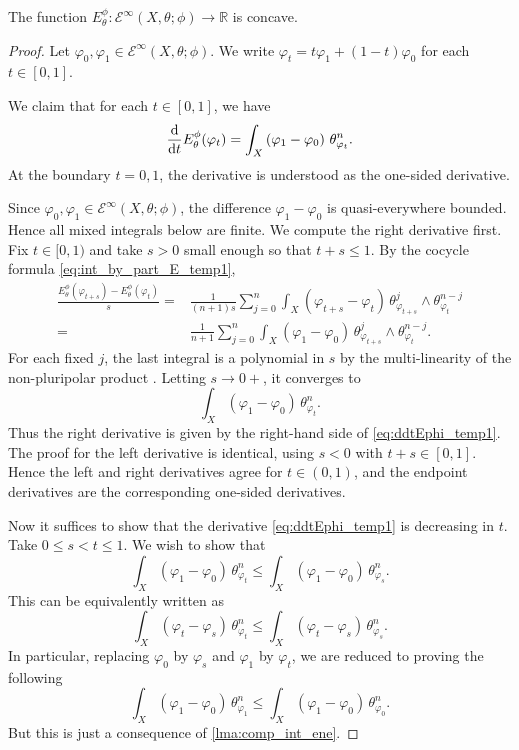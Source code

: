 \begin{lemma}\label{lma:Econcave1}
    The function $E^{\phi}_{\theta}\colon \mathcal{E}^{\infty}(X,\theta;\phi)\rightarrow \mathbb{R}$ is concave.
\end{lemma}
\begin{proof}
    Let $\varphi_0,\varphi_1\in \mathcal{E}^{\infty}(X,\theta;\phi)$. We write $\varphi_t=t\varphi_1+(1-t)\varphi_0$ for each $t\in [0,1]$.

    We claim that for each $t\in [0,1]$, we have
    \begin{equation}\label{eq:ddtEphi_temp1}
        \frac{\mathrm{d}}{\mathrm{d}t} E^{\phi}_{\theta}(\varphi_t) =\int_X \left(\varphi_1-\varphi_0\right)\,\theta_{\varphi_t}^n.
    \end{equation}
    At the boundary $t=0,1$, the derivative is understood as the one-sided derivative.

    Since $\varphi_0,\varphi_1\in \mathcal{E}^{\infty}(X,\theta;\phi)$, the difference $\varphi_1-\varphi_0$ is quasi-everywhere bounded. Hence all mixed integrals below are finite. We compute the right derivative first. Fix $t\in [0,1)$ and take $s>0$ small enough so that $t+s\leq 1$. By the cocycle formula \eqref{eq:int_by_part_E_temp1},
    \[
        \begin{aligned}
            \frac{E^{\phi}_{\theta}(\varphi_{t+s})-E^{\phi}_{\theta}(\varphi_t)}{s}
            =&\frac{1}{(n+1)s}\sum_{j=0}^n
            \int_X(\varphi_{t+s}-\varphi_t)\,
            \theta_{\varphi_{t+s}}^j\wedge\theta_{\varphi_t}^{n-j}\\
            =&\frac{1}{n+1}\sum_{j=0}^n
            \int_X(\varphi_1-\varphi_0)\,
            \theta_{\varphi_{t+s}}^j\wedge\theta_{\varphi_t}^{n-j}.
        \end{aligned}
    \]
    For each fixed $j$, the last integral is a polynomial in $s$ by the multi-linearity of the non-pluripolar product . Letting $s\to0+$, it converges to
    \[
        \int_X(\varphi_1-\varphi_0)\,\theta_{\varphi_t}^n.
    \]
    Thus the right derivative is given by the right-hand side of \eqref{eq:ddtEphi_temp1}. The proof for the left derivative is identical, using $s<0$ with $t+s\in[0,1]$. Hence the left and right derivatives agree for $t\in(0,1)$, and the endpoint derivatives are the corresponding one-sided derivatives.

    Now it suffices to show that the derivative \eqref{eq:ddtEphi_temp1} is decreasing in $t$.
    Take $0\leq s<t \leq 1$. We wish to show that
    \[
        \int_X (\varphi_1-\varphi_0)\,\theta_{\varphi_t}^n\leq \int_X (\varphi_1-\varphi_0)\,\theta_{\varphi_s}^n.
    \]
    This can be equivalently written as
    \[
    \int_X (\varphi_t-\varphi_s)\,\theta_{\varphi_t}^n\leq \int_X (\varphi_t-\varphi_s)\,\theta_{\varphi_s}^n.
    \]
    In particular, replacing $\varphi_0$ by $\varphi_s$ and $\varphi_1$ by $\varphi_t$, we are reduced to proving the following
    \[
        \int_X (\varphi_1-\varphi_0)\,\theta_{\varphi_1}^n\leq \int_X (\varphi_1-\varphi_0)\,\theta_{\varphi_0}^n.
    \]
    But this is just a consequence of \cref{lma:comp_int_ene}.
\end{proof}


